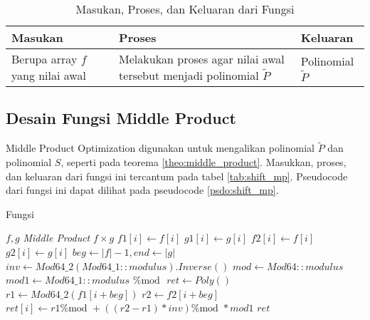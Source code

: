 \begin{table}[]	
	\Centering
	\begin{tabular}{|p{3cm}|p{3cm}|p{3cm}|}
	\hline
	Masukan & Proses & Keluaran \\ \hline
	Berupa array $ f $ yang nilai awal & Melakukan proses agar nilai awal tersebut menjadi polinomial $ \tilde{P}$ & Polinomial $ \tilde{P} $ \\ \hline
	\end{tabular}
	\caption{Masukan, Proses, dan Keluaran dari Fungsi }
	\label{tab:shift_conv}
\end{table}

\newpage

\subsection{Desain Fungsi Middle Product}
Middle Product Optimization digunakan untuk mengalikan polinomial $ \tilde{P} $ dan polinomial $S$, seperti pada teorema \ref{theo:middle_product}. Masukkan, proses, dan keluaran dari fungsi ini tercantum pada tabel \ref{tab:shift_mp}. Pseudocode dari fungsi ini dapat dilihat pada pseudocode \ref{psdo:shift_mp}. 

\begin{algorithm}
	\caption{Fungsi }
	\label{psdo:shift_mp}
	\begin{algorithmic}[1]
		\Require $ f , g $
		\State \textit{Middle Product }$ f \times g $
			\State $f1[i] \leftarrow f[i] $
		\EndFor
			\State $g1[i] \leftarrow g[i] $
		\EndFor
		\State {}
			\State $f2[i] \leftarrow f[i] $
		\EndFor
			\State $g2[i] \leftarrow g[i] $
		\EndFor
		\State {}
		\State $ beg \leftarrow |f| - 1, end \leftarrow |g| $
		\State $ inv \leftarrow Mod64\_2(Mod64\_1::modulus).Inverse() $
		\State $ mod \leftarrow Mod64::modulus $
		\State $ mod1 \leftarrow Mod64\_1::modulus \text{ \% mod }$
		\State $ ret \leftarrow Poly() $
			\State $ r1 \leftarrow Mod64\_2(f1[i + beg])$
			\State $ r2 \leftarrow f2[i + beg] $
			\State $ ret[i] \leftarrow r1 \text{\% mod } + ((r2 - r1) * inv)  \text{\% mod } * mod1$
		\EndFor
		\State \Return $ ret $
	\end{algorithmic}
\end{algorithm}

